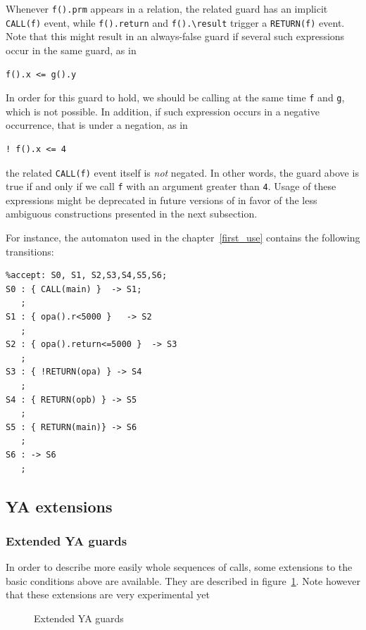 \documentclass{frama-c-book}
\begin{document}
Whenever \lstinline|f().prm| appears in a relation, the
related guard has an implicit \lstinline|CALL(f)| event, while
\lstinline|f().return|
and \lstinline|f().\result| trigger a \lstinline|RETURN(f)| event.
Note that this might result in an always-false guard if several such
expressions occur in the same guard, as in
\begin{lstlisting}[language=ya]
f().x <= g().y
\end{lstlisting}
In order for this guard to hold, we should be calling at the same time \verb+f+
and \verb+g+, which is not possible. In addition, if such expression occurs in
a negative occurrence, that is under a negation, as in
\begin{lstlisting}[language=ya]
! f().x <= 4
\end{lstlisting}
the related \lstinline|CALL(f)| event itself is {\it not} negated.
In other words,
the guard above is true if and only if we call \lstinline|f| with an argument
greater than \lstinline|4|. Usage of these expressions might be deprecated in
future versions of \aorai in favor of the less ambiguous constructions
presented in the next subsection.

For instance, the automaton used in the chapter~\ref{first_use} contains the
following transitions:
\begin{lstlisting}[language=ya]
%init: S0;
%accept: S0, S1, S2,S3,S4,S5,S6;
S0 : { CALL(main) }  -> S1;
   ;
S1 : { opa().r<5000 }   -> S2
   ;
S2 : { opa().return<=5000 }  -> S3
   ;
S3 : { !RETURN(opa) } -> S4
   ;
S4 : { RETURN(opb) } -> S5
   ;
S5 : { RETURN(main)} -> S6
   ;
S6 : -> S6
   ;
\end{lstlisting}

\subsection{YA extensions}\label{sec:ya-extensions}
\subsubsection{Extended YA guards}
In order to describe more easily whole sequences of calls, some extensions to
the basic conditions above are available. They are described in
figure~\ref{fig:ya-extensions}. Note however that these extensions are very
experimental yet

\lstset{language=ya}

\begin{figure}[ht]
  
  \caption{Extended YA guards}
  \label{fig:ya-extensions}
\end{figure}
\end{document}
